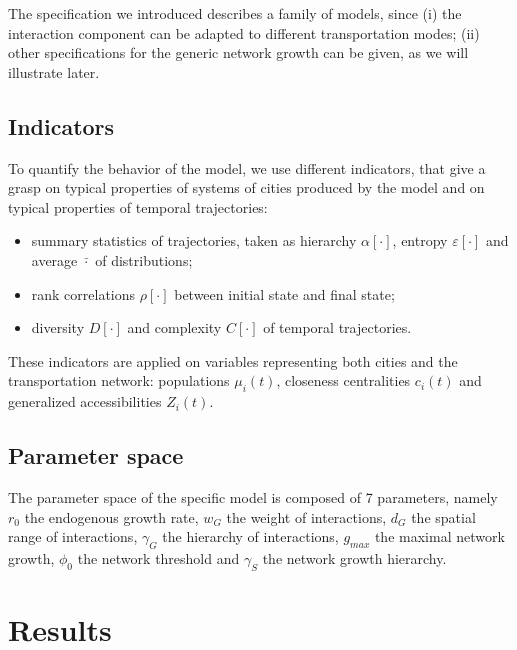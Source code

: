The specification we introduced describes a family of models, since (i) the interaction component can be adapted to different transportation modes; (ii) other specifications for the generic network growth can be given, as we will illustrate later.


\subsection{Indicators}

To quantify the behavior of the model, we use different indicators, that give a grasp on typical properties of systems of cities produced by the model and on typical properties of temporal trajectories:
\begin{itemize}
	\item summary statistics of trajectories, taken as hierarchy $\alpha\left[\cdot\right]$, entropy $\varepsilon\left[\cdot\right]$ and average $\bar{\cdot}$ of distributions;
	\item rank correlations $\rho\left[\cdot\right]$ between initial state and final state;
	\item diversity $D\left[\cdot\right]$ and complexity $C\left[\cdot\right]$ of temporal trajectories.
\end{itemize}

These indicators are applied on variables representing both cities and the transportation network: populations $\mu_i(t)$, closeness centralities $c_i (t)$ and generalized accessibilities $Z_i (t)$.


\subsection{Parameter space}

The parameter space of the specific model is composed of 7 parameters, namely $r_0$ the endogenous growth rate, $w_G$ the weight of interactions, $d_G$ the spatial range of interactions, $\gamma_G$ the hierarchy of interactions, $g_{max}$ the maximal network growth, $\phi_0$ the network threshold and $\gamma_S$ the network growth hierarchy.


\section{Results}



